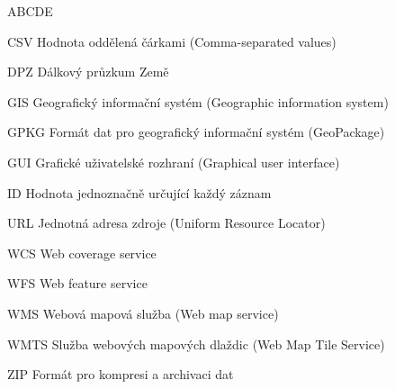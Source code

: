 
\begin{seznamzkratek}{ABCDE}      
	             	                   
          {CSV}
          {Hodnota oddělená čárkami (Comma-separated values)} 
          
	      {DPZ}
	      {Dálkový průzkum Země}  
          
	      {GIS}
	      {Geografický informační systém (Geographic information system)}
          
	      {GPKG}
	      {Formát dat pro geografický informační systém (GeoPackage)}
          
	      {GUI}
	      {Grafické uživatelské rozhraní (Graphical user interface)}
	               	             
	      {ID}
	      {Hodnota jednoznačně určující každý záznam} 	      	     
          
          {URL}
          {Jednotná adresa zdroje (Uniform Resource Locator)}                
          
	      {WCS}
	      {Web coverage service}
                                          
	      {WFS}
	      {Web feature service}         
            
	      {WMS}
	      {Webová mapová služba (Web map service)} 	

	      {WMTS}
	      {Služba webových mapových dlaždic (Web Map Tile Service)} 
          
          {ZIP}
          {Formát pro kompresi a archivaci dat} 	
          
	      	      
\end{seznamzkratek}